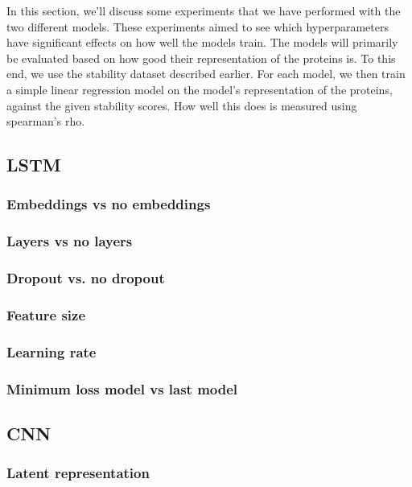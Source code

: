 In this section, we'll discuss some experiments that we have performed with the two different models. These experiments aimed to see which hyperparameters have significant effects on how well the models train. The models will primarily be evaluated based on how good their representation of the proteins is. To this end, we use the stability dataset described earlier. For each model, we then train a simple linear regression model on the model's representation of the proteins, against the given stability scores. How well this does is measured using spearman's rho.
\subsection{LSTM}  %
\subsubsection{Embeddings vs no embeddings} %


\subsubsection{Layers vs no layers} %


\subsubsection{Dropout vs. no dropout} %


\subsubsection{Feature size} %


\subsubsection{Learning rate} %


\subsubsection{Minimum loss model vs last model} %


\subsection{CNN} %
\subsubsection{Latent representation} %

